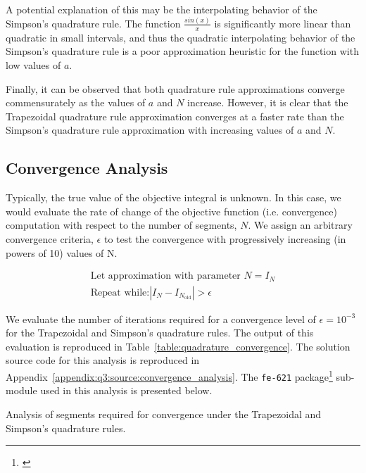 \documentclass[10pt]{article}
\begin{document}
    A potential explanation of this may be the interpolating behavior of the Simpson's quadrature rule. The function $\frac{sin{(x)}}{x}$ is significantly more linear than quadratic in small intervals, and thus the quadratic interpolating behavior of the Simpson's quadrature rule is a poor approximation heuristic for the function with low values of $a$.

    Finally, it can be observed that both quadrature rule approximations converge commensurately as the values of $a$ and $N$ increase. However, it is clear that the Trapezoidal quadrature rule approximation converges at a faster rate than the Simpson's quadrature rule approximation with increasing values of $a$ and $N$.


    \subsection{Convergence Analysis} 

    Typically, the true value of the objective integral is unknown. In this case, we would evaluate the rate of change of the objective function (i.e. convergence) computation with respect to the number of segments, $N$. We assign an arbitrary convergence criteria, $\epsilon$ to test the convergence with progressively increasing (in powers of 10) values of N.

    \begin{gather*}
        \text{Let approximation with parameter $N$} = I_N \\
        \text{Repeat while:} \left| I_N - I_{N_\text{old}} \right| > \epsilon
    \end{gather*}

    We evaluate the number of iterations required for a convergence level of $\epsilon = 10^{-3}$ for the Trapezoidal and Simpson's quadrature rules. The output of this evaluation is reproduced in Table~\ref{table:quadrature_convergence}. The solution source code for this analysis is reproduced in Appendix~\ref{appendix:q3:source:convergence_analysis}. The \texttt{fe-621} package\footnote{\cite{Weerawarana2019}} sub-module used in this analysis is presented below.

    

    \begin{table}[h]
        \centering
        \caption{Analysis of segments required for convergence under the Trapezoidal and Simpson's quadrature rules.}
        \label{table:quadrature_convergence}
    \end{table}
\end{document}
